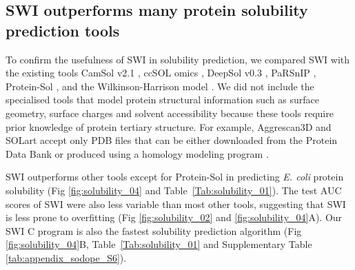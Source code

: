 \subsection{SWI outperforms many protein solubility prediction tools}
To confirm the usefulness of SWI in solubility prediction, we compared SWI with the existing tools CamSol v2.1 \citep{Sormanni2015-yr,Sormanni2017-lo}, ccSOL omics \citep{Agostini2014-te}, DeepSol v0.3 \citep{Khurana2018-xl}, PaRSnIP \citep{Rawi2018-xo}, Protein-Sol \citep{Hebditch2017-bg}, and the Wilkinson-Harrison model \citep{Wilkinson1991-zp,Davis1999-ha,Harrison2000-wm}. We did not include the specialised tools that model protein structural information such as surface geometry, surface charges and solvent accessibility because these tools require prior knowledge of protein tertiary structure. For example, Aggrescan3D and SOLart accept only PDB files that can be either downloaded from the Protein Data Bank or produced using a homology modeling program \citep{hou2020solart,Kuriata2019-ku}.

SWI outperforms other tools except for Protein-Sol in predicting \textit{E. coli} protein solubility (Fig \ref{fig:solubility_04} and Table~\ref{Tab:solubility_01}). The test AUC scores of SWI were also less variable than most other tools, suggesting that SWI is less prone to overfitting (Fig \ref{fig:solubility_02} and  \ref{fig:solubility_04}A). Our SWI C program is also the fastest solubility prediction algorithm (Fig \ref{fig:solubility_04}B, Table~\ref{Tab:solubility_01} and Supplementary Table \ref{tab:appendix_sodope_S6}).




